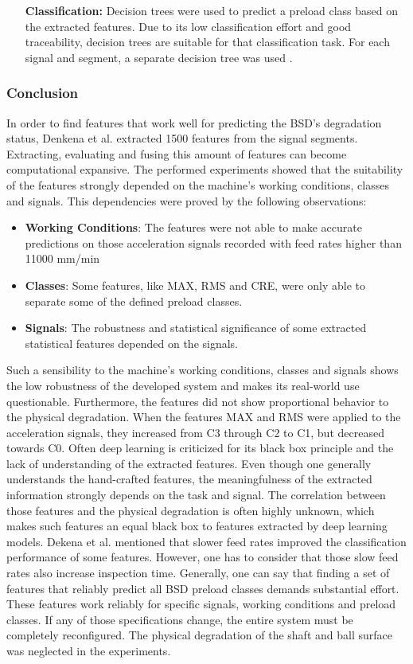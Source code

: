 \begin{itemize}
    \item [\textbf{Classification:}] Decision trees were used to predict a preload class based on the extracted features. Due to its low classification effort and good traceability, decision trees are suitable for that classification task. For each signal and segment, a separate decision tree was used \cite{Denkena2021}. 
\end{itemize}

\subsubsection{Conclusion}
In order to find features that work well for predicting the BSD's degradation status, Denkena et al. \cite{Denkena2021} extracted 1500 features from the signal segments. Extracting, evaluating and fusing this amount of features can become computational expansive. The performed experiments showed that the suitability of the features strongly depended on the machine's working conditions, classes and signals. This dependencies were proved by the following observations:
\begin{itemize}
    \item \textbf{Working Conditions}: The features were not able to make accurate predictions on those acceleration signals recorded with feed rates higher than 11000 mm/min
    \item \textbf{Classes}: Some features, like MAX, RMS and CRE, were only able to separate some of the defined preload classes. 
    \item \textbf{Signals}: The robustness and statistical significance of some extracted statistical features depended on the signals. 
\end{itemize}
Such a sensibility to the machine's working conditions, classes and signals shows the low robustness of the developed system and makes its real-world use questionable. Furthermore, the features did not show proportional behavior to the physical degradation. When the features MAX and RMS were applied to the acceleration signals, they increased from C3 through C2 to C1, but decreased towards C0. Often deep learning is criticized for its black box principle and the lack of understanding of the extracted features. Even though one generally understands the hand-crafted features, the meaningfulness of the extracted information strongly depends on the task and signal. The correlation between those features and the physical degradation is often highly unknown, which makes such features an equal black box to features extracted by deep learning models. Dekena et al. \cite{Denkena2021} mentioned that slower feed rates improved the classification performance of some features. However, one has to consider that those slow feed rates also increase inspection time. Generally, one can say that finding a set of features that reliably predict all BSD preload classes demands substantial effort. These features work reliably for specific signals, working conditions and preload classes. If any of those specifications change, the entire system must be completely reconfigured. The physical degradation of the shaft and ball surface was neglected in the experiments.

